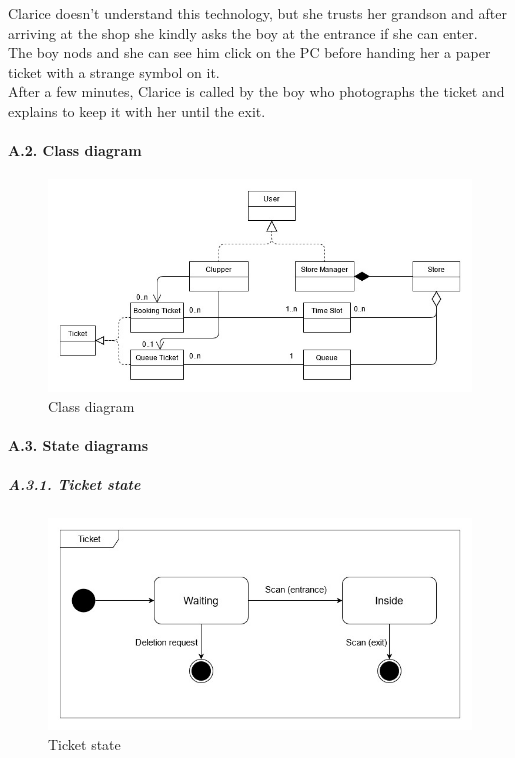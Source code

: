 \documentclass[
]{article}
\begin{document}
Clarice doesn't understand this technology, but she trusts her grandson
and after arriving at the shop she kindly asks the boy at the entrance
if she can enter.\\
The boy nods and she can see him click on the PC before handing her a
paper ticket with a strange symbol on it.\\
After a few minutes, Clarice is called by the boy who photographs the
ticket and explains to keep it with her until the exit.

\hypertarget{a.2.-class-diagram}{%
\paragraph{A.2. Class diagram}\label{a.2.-class-diagram}}

\begin{figure}
\centering
\includegraphics{assets/rasd/class_diagram/class_diagram_rasd.jpg}
\caption{Class diagram}
\end{figure}

\hypertarget{a.3.-state-diagrams}{%
\paragraph{A.3. State diagrams}\label{a.3.-state-diagrams}}

\hypertarget{a.3.1.-ticket-state}{%
\subparagraph{\texorpdfstring{A.3.1. Ticket state
}{A.3.1. Ticket state }}\label{a.3.1.-ticket-state}}

\begin{figure}
\centering
\includegraphics{assets/rasd/state_diagrams/ticket_state.jpg}
\caption{Ticket state}
\end{figure}
\end{document}
